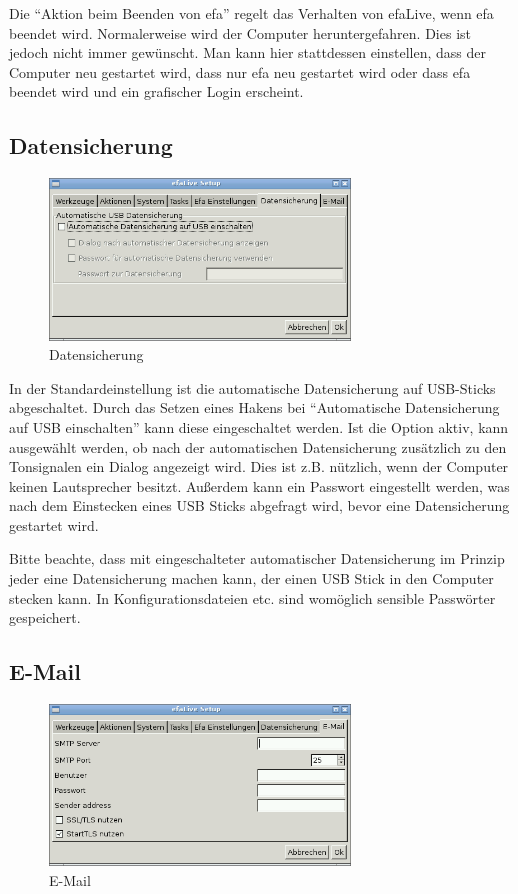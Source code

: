\documentclass[a4paper,12pt,twoside]{article}
\begin{document}
Die "`Aktion beim Beenden von efa"' regelt das
Verhalten von efaLive, wenn efa beendet wird. Normalerweise wird der
Computer heruntergefahren. Dies ist jedoch nicht immer gewünscht. Man
kann hier stattdessen einstellen, dass der Computer neu gestartet wird, 
dass nur efa neu gestartet wird oder dass efa beendet wird und ein 
grafischer Login erscheint.


\subsection{Datensicherung}
\label{sct:efalivesetup_backup}

\begin{figure}
    \centering
    \includegraphics[width=8cm]{screenshots/efalive_setup_backup.png}
    \caption{Datensicherung}
    \label{fig:efalivesetup_backup}
\end{figure}

In der Standardeinstellung ist die automatische Datensicherung auf
USB-Sticks abgeschaltet. Durch das Setzen eines Hakens bei
"`Automatische Datensicherung auf USB
einschalten"' kann diese eingeschaltet werden. Ist die
Option aktiv, kann ausgewählt werden, ob nach der automatischen
Datensicherung zusätzlich zu den Tonsignalen ein Dialog angezeigt wird.
Dies ist z.B. nützlich, wenn der Computer keinen Lautsprecher besitzt. 
Außerdem kann ein Passwort eingestellt werden, was nach dem Einstecken
eines USB Sticks abgefragt wird, bevor eine Datensicherung gestartet wird.

Bitte beachte, dass mit eingeschalteter automatischer Datensicherung im
Prinzip jeder eine Datensicherung machen kann, der einen USB Stick in
den Computer stecken kann. In Konfigurationsdateien etc. sind womöglich
sensible Passwörter gespeichert.


\subsection{E-Mail}
\label{sct:efalivesetup_email}

\begin{figure}
    \centering
    \includegraphics[width=8cm]{screenshots/efalive_setup_email.png}
    \caption{E-Mail}
    \label{fig:efalivesetup_email}
\end{figure}
\end{document}
